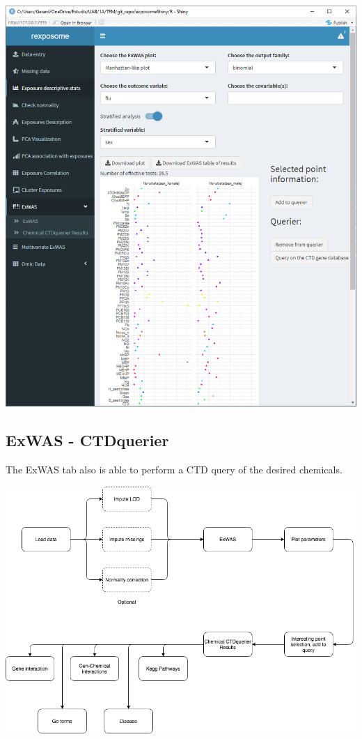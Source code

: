 \documentclass[
]{book}
\begin{document}
\includegraphics{images/analysis7_7.png}

\hypertarget{exwas---ctdquerier}{%
\subsection{ExWAS - CTDquerier}\label{exwas---ctdquerier}}

The ExWAS tab also is able to perform a CTD query of the desired chemicals.

\includegraphics{images/analysis7_3.png}
\end{document}
